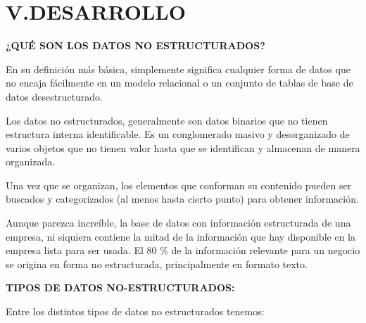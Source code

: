 \documentclass{article} %
\begin{document}
\noindent 
\section{}

\noindent 
\section{ V.DESARROLLO}

\noindent 

\noindent \textbf{¿QU\'{E} SON LOS DATOS NO ESTRUCTURADOS?}

\noindent \textbf{}

\noindent En su definici\'{o}n m\'{a}s b\'{a}sica, simplemente significa cualquier forma de datos que no encaja f\'{a}cilmente en un modelo relacional o un conjunto de tablas de base de datos desestructurado.

\noindent 

\noindent Los datos no estructurados, generalmente son datos binarios que no tienen estructura interna identificable. Es un conglomerado masivo y desorganizado de varios objetos que no tienen valor hasta que se identifican y almacenan de manera organizada.

\noindent 

\noindent Una vez que se organizan, los elementos que conforman su contenido pueden ser buscados y categorizados (al menos hasta cierto punto) para obtener informaci\'{o}n.

\noindent 

\noindent Aunque parezca incre\'{i}ble, la base de datos con informaci\'{o}n estructurada de una empresa, ni siquiera contiene la mitad de la informaci\'{o}n que hay disponible en la empresa lista para ser usada. El 80 \% de la informaci\'{o}n relevante para un negocio se origina en forma no estructurada, principalmente en formato texto.

\noindent 

\noindent 

\noindent 

\noindent \textbf{TIPOS DE DATOS NO-ESTRUCTURADOS:}

\noindent 

\noindent Entre los distintos tipos de datos no estructurados tenemos:
\end{document}
